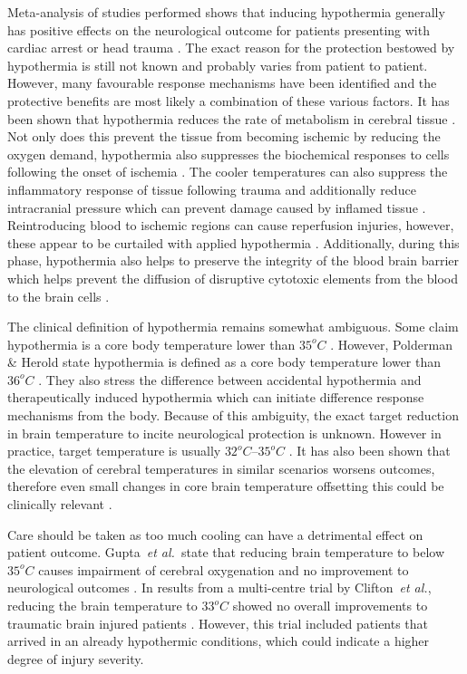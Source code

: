 \documentclass[11pt,english,a4paper,twoside,openright]{report}
\begin{document}
{{{{{{{{	Meta-analysis of studies performed shows that inducing hypothermia generally has positive effects on the neurological outcome for patients presenting with cardiac arrest \cite{arrich2016hypothermia} or head trauma \cite{crossley2014systematic}. The exact reason for the protection bestowed by hypothermia is still not known and probably varies from patient to patient. However, many favourable response mechanisms have been identified and the protective benefits are most likely a combination of these various factors. It has been shown that hypothermia reduces the rate of metabolism in cerebral tissue \cite{michenfelder1991relationship}. Not only does this prevent the tissue from becoming ischemic by reducing the oxygen demand, hypothermia also suppresses the biochemical responses to cells following the onset of ischemia \cite{busto1989effect}. The cooler temperatures can also suppress the inflammatory response of tissue following trauma \cite{karnatovskaia2014therapeutic} and additionally reduce intracranial pressure which can prevent damage caused by inflamed tissue \cite{polderman2004application}. Reintroducing blood to ischemic regions can cause reperfusion injuries, however, these appear to be curtailed with applied hypothermia \cite{karnatovskaia2014therapeutic}. Additionally, during this phase, hypothermia also helps to preserve the integrity of the blood brain barrier which helps prevent the diffusion of disruptive cytotoxic elements from the blood to the brain cells \cite{polderman2009mechanisms}.
	
	
	The clinical definition of hypothermia remains somewhat ambiguous. Some claim hypothermia is a core body temperature lower than $35^{o}C$ \cite{brown2012accidental}. However, Polderman \& Herold state hypothermia is defined as a core body temperature lower than $36^{o}C$  \cite{polderman2009therapeutic}. They also stress the difference between accidental hypothermia and therapeutically induced hypothermia which can initiate difference response mechanisms from the body. Because of this ambiguity, the exact target reduction in brain temperature to incite neurological protection is unknown. However in practice, target temperature is usually $32^{o}C$--$35^{o}C$ \cite{karnatovskaia2014therapeutic}\cite{arrich2016hypothermia}. It has also been shown that the elevation of cerebral temperatures in similar scenarios worsens outcomes, therefore even small changes in core brain temperature offsetting this could be clinically relevant \cite{mariak2002intracranial}.
	
	Care should be taken as too much cooling can have a detrimental effect on patient outcome. Gupta~\textit{et al.\ }state that reducing brain temperature to below $35^{o}C$ causes impairment of cerebral oxygenation and no improvement to neurological outcomes \cite{gupta2002effect}. In results from a multi-centre trial by Clifton~\textit{et al.}, reducing the brain temperature to $33^{o}C$ showed no overall improvements to traumatic brain injured patients \cite{clifton2001lack}. However, this trial included patients that arrived in an already hypothermic conditions, which could indicate a higher degree of injury severity.
	
}}}}}}}}
\end{document}
